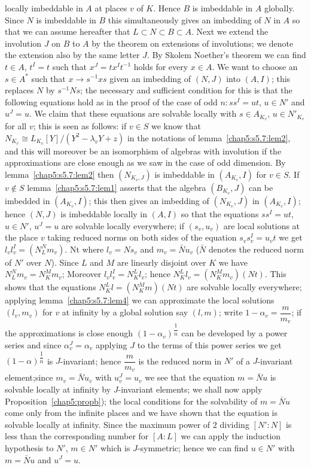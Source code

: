 \begin{lem}
locally imbeddable in $A$ at places $v$ of $K$. 
Hence $B$ is imbeddable in $A$ globally. Since $N$ is imbeddable in
$B$ this simultaneously gives an imbedding of $N$ in $A$ so that we
can assume hereafter that $L \subset N \subset B \subset A$. Next we
extend the involution $J$ on $B$ to $A$ by the theorem on extensions of
involutions; we denote the extension also by the same letter $J$. By
Skolem Noether's theorem we can find $t \in A$, $t^I = t$ such that
$x^J = tx^I t^{-1}$ holds for every $x \in A$. We want to choose an $s
\in A^*$ such that $x \to s^{-1}xs$ given an imbedding of $(N, J)$ into
$(A,I)$; this replaces $N$ by $s^{-1}Ns$; the necessary\pageoriginale
and sufficient 
condition for this is that the following equations hold as in the
proof of the case of odd $n: ss^I = ut$, $u \in N'$ and $u^J =u$. We
claim that these equations are solvable locally with $s \in A_{K_v}$, $u
\in N'_{K_v}$ for all $v$; this is seen as follows: if $v \in S$ we
know that $N_{K_v} \cong L_{K_v} [Y]/ (Y^2 - \lambda_v Y + z)$ in the
notations of lemma~\ref{chap5:s5.7:lem2}, and this will moreover be an isomorphism of
algebras with involution if the approximations are close enough as we
saw in the case of odd dimension. By lemma~\ref{chap5:s5.7:lem2} then $(N_{K_v, J})$ is
imbeddable in $(A_{K_v}, I)$ for $v \in S$. If $v \notin S$ lemma~\ref{chap5:s5.7:lem1}
asserts that the algebra $(B_{K_v}, J)$ can be imbedded in $(A_{K_v},
I)$; this  then gives an imbedding of $(N_{K_v}, J)$  in  $(A_{K_v},
I)$; hence $(N, J)$ is imbeddable locally in $(A,I)$ so that the
equations $ss^I = ut$, $u \in N'$, $u^J = u$ are solvable locally
everywhere; if $(s_v, u_v)$ are local solutions at the place $v$ taking
reduced norms on both sides of the equation $s_v s^I_v = u_v t$ we get
$l_v l_v^I = (N_L^N m_v)$. Nt where $l_v = Ns_v $ and $m_v =
\bar{N}u_v$ ($\bar{N}$ denotes the reduced norm of  $N'$ over
$N$). Since  $L$ and $M$ are linearly disjoint over $K$ we have $N^N_L
m_v= N^M_K m_v$; Moreover $l_v l_v^I = N^L_K l_v$; hence $ N^L_K l_v =
(N_K^M m_v)(Nt)$. This shows that the equations $ N^L_K l = (N^M_K
m)(Nt)$ are solvable locally everywhere; applying 
lemma~\ref{chap5:s5.7:lem4} we can
approximate the local solutions $(l_v, m_v)$ for $v$ at infinity by a
global solution say $(l,m)$; write $1- \alpha_v = \dfrac{m}{m_v}$; if the
approximations is close enough $(1-\alpha_v )^{\dfrac{1}{n}}$ can be
developed by a power series and since $\alpha^J_v = \alpha_v$ applying
$J$ to the terms of this power series we get $(1 -
\alpha)^{\dfrac{1}{n}}$ is $J$-invariant; hence $\dfrac{m}{m_v}$ is the
reduced norm in $N'$ of a  $J$-invariant element;\pageoriginale since
$m_v = 
\bar{N}u_v$ with $u^J_v = u_v$ we see that the equation $m = \bar{N}u$
is solvable locally at infinity  by $J$-invariant elements; we shall now
apply Proposition~\ref{chap5:propb}); the local conditions for the solvability of $m
= \bar{N}u$ come only from the infinite places  and we have  shown that
the equation is solvable locally at infinity. Since the maximum power
of $2$ dividing $[N' : N]$ is less  than the corresponding number for
$[A : L]$ we can apply the induction hypothesis to $N'$, $m \in N'$
which is $J$-symmetric; hence we can find $u \in N'$ with $m = \bar{N}u$
and $u^J = u$. 
\end{lem}

